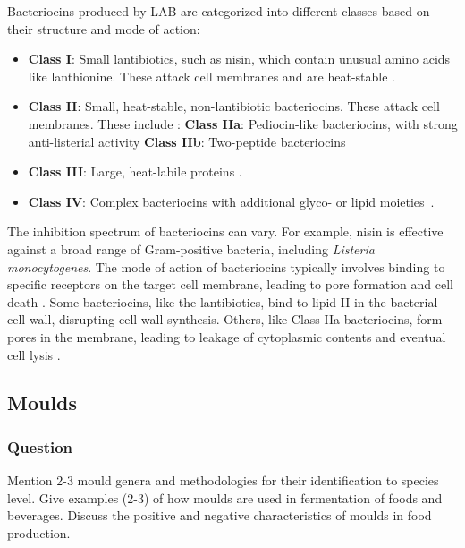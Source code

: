 Bacteriocins produced by LAB are categorized into different classes based on their structure and mode of action:
\begin{itemize}
    \item \textbf{Class I}: Small lantibiotics, such as nisin, which contain unusual amino acids like lanthionine. These attack cell membranes and are heat-stable \cite*{L3-LAB}.
    \item \textbf{Class II}: Small, heat-stable, non-lantibiotic bacteriocins. These attack cell membranes. These include \cite*{L3-LAB}:
    \subitem \textbf{Class IIa}: Pediocin-like bacteriocins, with strong anti-listerial activity
    \subitem \textbf{Class IIb}: Two-peptide bacteriocins
    \item \textbf{Class III}: Large, heat-labile proteins \cite*{L8-MicroInFood}.
    \item \textbf{Class IV}: Complex bacteriocins with additional glyco- or lipid moieties \cite*{L8-MicroInFood}.
\end{itemize}

The inhibition spectrum of bacteriocins can vary. For example, nisin is effective against a broad range of Gram-positive bacteria, including \textit{Listeria monocytogenes}. The mode of action of bacteriocins typically involves binding to specific receptors on the target cell membrane, leading to pore formation and cell death \cite*{L3-LAB}. Some bacteriocins, like the lantibiotics, bind to lipid II in the bacterial cell wall, disrupting cell wall synthesis. Others, like Class IIa bacteriocins, form pores in the membrane, leading to leakage of cytoplasmic contents and eventual cell lysis \cite*{L3-LAB}.

\subsection{Moulds}
\subsubsection*{Question}
Mention 2-3 mould genera and methodologies for their identification to species level. Give examples (2-3) of how moulds are used in fermentation of foods and beverages. Discuss the positive and negative characteristics of moulds in food production. 

